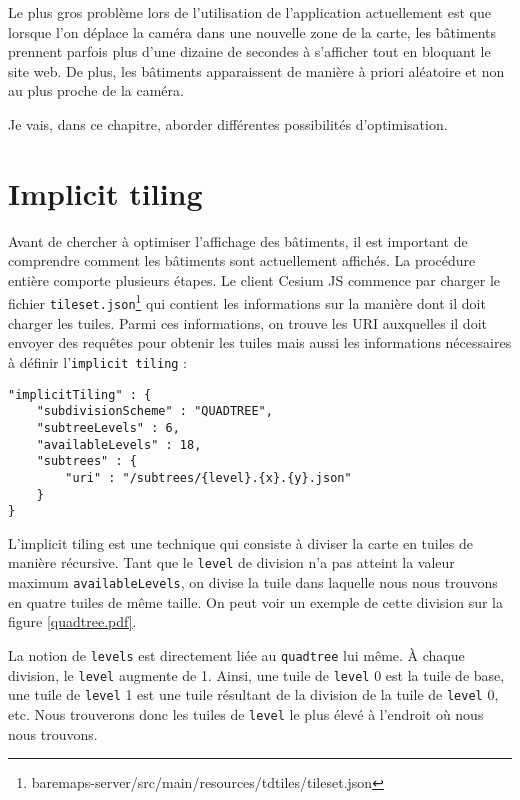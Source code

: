 Le plus gros problème lors de l'utilisation de l'application actuellement est que lorsque l'on déplace la caméra dans une nouvelle zone de la carte, les bâtiments prennent parfois plus d'une dizaine de secondes à s'afficher tout en bloquant le site web. De plus, les bâtiments apparaissent de manière à priori aléatoire et non au plus proche de la caméra.

Je vais, dans ce chapitre, aborder différentes possibilités d'optimisation.

\newpage
\section{Implicit tiling}
\label{sec:implicit-tiling}

Avant de chercher à optimiser l'affichage des bâtiments, il est important de comprendre comment les bâtiments sont actuellement affichés. La procédure entière comporte plusieurs étapes. Le client Cesium JS commence par charger le fichier \texttt{tileset.json}\footnote{baremaps-server/src/main/resources/tdtiles/tileset.json} qui contient les informations sur la manière dont il doit charger les tuiles. Parmi ces informations, on trouve les URI auxquelles il doit envoyer des requêtes pour obtenir les tuiles mais aussi les informations nécessaires à définir l'\texttt{implicit tiling} :

\begin{verbatim}
"implicitTiling" : {
    "subdivisionScheme" : "QUADTREE",
    "subtreeLevels" : 6,
    "availableLevels" : 18,
    "subtrees" : {
        "uri" : "/subtrees/{level}.{x}.{y}.json"
    }
}
\end{verbatim}

L'\Gls{implicit tiling} est une technique qui consiste à diviser la carte en tuiles de manière récursive. Tant que le \texttt{level} de division n'a pas atteint la valeur maximum \texttt{availableLevels}, on divise la tuile dans laquelle nous nous trouvons en quatre tuiles de même taille. On peut voir un exemple de cette division sur la figure \ref{quadtree.pdf}.


\newpage
La notion de \texttt{levels} est directement liée au \texttt{quadtree} lui même. À chaque division, le \texttt{level} augmente de 1. Ainsi, une tuile de \texttt{level} 0 est la tuile de base, une tuile de \texttt{level} 1 est une tuile résultant de la division de la tuile de \texttt{level} 0, etc. Nous trouverons donc les tuiles de \texttt{level} le plus élevé à l'endroit où nous nous trouvons.

